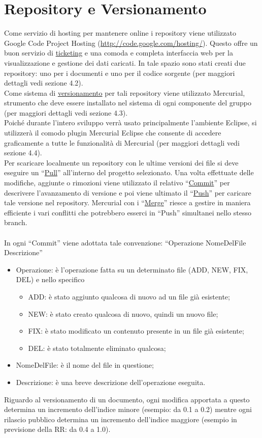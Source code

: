 \chapter{Repository e Versionamento}
\thispagestyle{fancy}
Come servizio di hosting per mantenere online i repository
viene utilizzato Google Code Project Hosting
(\url{http://code.google.com/hosting/}). Questo offre un buon
servizio di \underline{ticketing} e una comoda e completa interfaccia web per
la visualizzazione e gestione dei dati caricati. In tale spazio sono
stati creati due repository: uno per i documenti e uno per il codice sorgente
(per maggiori dettagli vedi sezione 4.2). 
\\
Come sistema di
\underline{versionamento} per tali repository viene utilizzato Mercurial,
strumento che deve essere installato nel sistema di ogni componente del gruppo
(per maggiori dettagli vedi sezione 4.3).
\\
Poich\'e durante l'intero sviluppo verr\`a usato principalmente l'ambiente
Eclipse, si utilizzer\`a il comodo plugin Mercurial Eclipse che consente di accedere
graficamente a tutte le funzionalit\`a di Mercurial (per maggiori dettagli vedi
sezione 4.4). 
\\
Per scaricare localmente un repository con le ultime versioni dei
file si deve eseguire un ``\underline{Pull}'' all'interno del progetto
selezionato. Una volta effettuate delle modifiche, aggiunte o rimozioni viene
utilizzato il relativo ``\underline{Commit}'' per descrivere l'avanzamento di
versione e poi viene ultimato il ``\underline{Push}'' per caricare tale versione
nel repository. Mercurial con i ``\underline{Merge}'' riesce a gestire in maniera efficiente i vari conflitti
che potrebbero esserci in ``Push'' simultanei nello stesso branch.\\ 
\\
In ogni ``Commit'' viene adottata tale convenzione: 
``Operazione NomeDelFile Descrizione''
\begin{itemize}
\item {Operazione: \`e l'operazione fatta su un determinato file (ADD, NEW, FIX,
DEL) e nello specifico}
\begin {itemize}
\item {ADD: \`e stato aggiunto qualcosa di nuovo ad un file gi\`a esistente;}
\item {NEW: \`e stato creato qualcosa di nuovo, quindi un nuovo file;} 
\item {FIX: \`e stato modificato un contenuto presente in un file gi\`a
esistente;} 
\item {DEL: \`e stato totalmente eliminato qualcosa;}
\end {itemize}
\item {NomeDelFile: \`e il nome del file in questione;}
\item {Descrizione: \`e una breve descrizione dell'operazione eseguita.}
\end{itemize}
Riguardo al versionamento di un documento, ogni modifica apportata a questo
determina un incremento dell'indice minore (esempio: da 0.1 a 0.2) mentre ogni
rilascio pubblico determina un incremento dell'indice maggiore (esempio in
previsione della RR: da 0.4 a 1.0).


